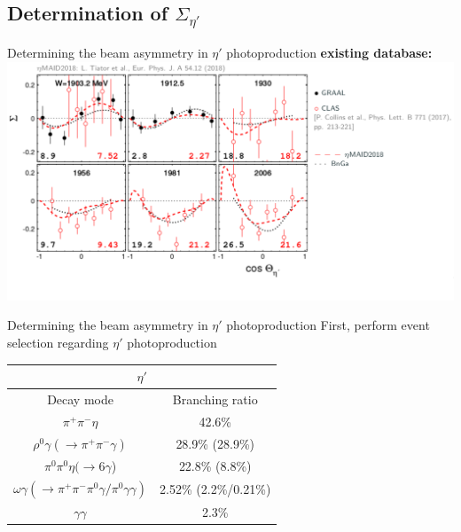 \documentclass[11pt,aspectratio=169,dvipsnames]{beamer}
\begin{document}
	
	
	
	\subsection{Determination of $\Sigma_{\eta'}$}
	\begin{frame}{Determining the beam asymmetry in $\eta'$ photoproduction}
		\textbf{existing database:}
		{\centering
		\includegraphics[width=\linewidth]{etap_bildchen}}
	\end{frame}
	\begin{frame}{Determining the beam asymmetry in $\eta'$ photoproduction}
		First, perform event selection regarding $\eta'$ photoproduction
		\begin{table}
\centering
\begin{tabular}{cc}
	\toprule
	\multicolumn{2}{c}{$\eta'$}\\
	\hline
	Decay mode&Branching ratio\\
	\hline
	$\pi^+\pi^-\eta$&42.6\%\\
	$\rho^0\gamma(\to\pi^+\pi^-\gamma)$ &28.9\% (28.9\%)\\
	$\pi^0\pi^0\eta(\to6\gamma$) & 22.8\% (8.8\%)\\
	$\omega\gamma(\to \pi^+\pi^-\pi^0\gamma/\pi^0\gamma\gamma)$&2.52\% (2.2\%/0.21\%)\\
	$\gamma\gamma$&2.3\%\\
	\bottomrule
\end{tabular}
		\end{table}
		\begin{flushright}
			\cites{pdg}
		\end{flushright}
	\end{frame}
\end{document}
